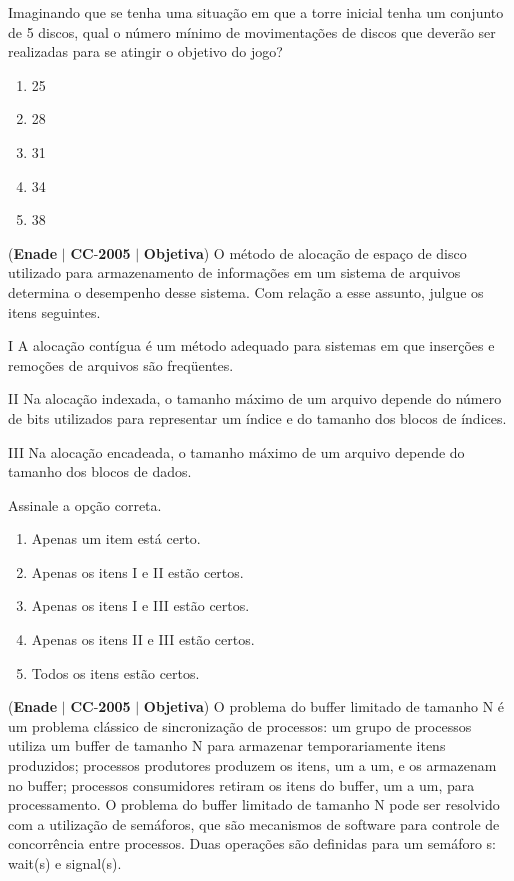\documentclass{exam}
\begin{document}
\begin{questions}
Imaginando que se tenha uma situação em que a torre inicial tenha
um conjunto de 5 discos, qual o número mínimo de movimentações
de discos que deverão ser realizadas para se atingir o objetivo do
jogo?
	\begin{enumerate}[label=\alph*)]
		\item  25
		\item  28
		\item  31
		\item  34
		\item  38
	\end{enumerate}

\question (\textbf{Enade} $|$ \textbf{CC}-\textbf{2005} $|$ \textbf{Objetiva})
O método de alocação de espaço de disco utilizado para
armazenamento de informações em um sistema de arquivos
determina o desempenho desse sistema. Com relação a esse assunto,
julgue os itens seguintes.

I A alocação contígua é um método adequado para sistemas em
que inserções e remoções de arquivos são freqüentes.

II Na alocação indexada, o tamanho máximo de um arquivo
depende do número de bits utilizados para representar um índice
e do tamanho dos blocos de índices.

III Na alocação encadeada, o tamanho máximo de um arquivo
depende do tamanho dos blocos de dados.

Assinale a opção correta.
	\begin{enumerate}[label=\alph*)]
		\item  Apenas um item está certo.
		\item  Apenas os itens I e II estão certos.
		\item  Apenas os itens I e III estão certos.
		\item  Apenas os itens II e III estão certos.
		\item  Todos os itens estão certos.
	\end{enumerate}

\question (\textbf{Enade} $|$ \textbf{CC}-\textbf{2005} $|$ \textbf{Objetiva})
O problema do buffer limitado de tamanho N é um
problema clássico de sincronização de processos: um grupo de
processos utiliza um buffer de tamanho N para armazenar
temporariamente itens produzidos; processos produtores
produzem os itens, um a um, e os armazenam no buffer;
processos consumidores retiram os itens do buffer, um a um,
para processamento. O problema do buffer limitado de tamanho
N pode ser resolvido com a utilização de semáforos, que são
mecanismos de software para controle de concorrência entre
processos. Duas operações são definidas para um semáforo
s: wait(s) e signal(s).


\end{questions}
\end{document}
